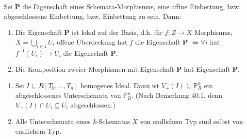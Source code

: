 \begin{rem}[40]
  Sei \textbf{P} die Eigenschaft eines Schemata-Morphismus, eine affine
  Einbettung, bzw. abgeschlossene Einbettung, bzw. Einbettung zu sein.
  Dann:
  \begin{enumerate}
  \item Die Eigenschaft \textbf{P} ist lokal auf der Basis, d.h. für $f:Z\rightarrow X$
    Morphismus, $X=\bigcup_{i\in I}U_{i}$ offene Überdeckung hat $f$
    die Eigenschaft \textbf{P} $\Longleftrightarrow\forall i$ hat $f^{-1}(U_{i})\rightarrow U_{i}$
    die Eigenschaft \textbf{P}.
  \item Die Komposition zweier Morphismen mit Eigenschaft \textbf{P} hat Eigenschaft
    \textbf{P}.
  \end{enumerate}
\end{rem}

\begin{example}[41]
  \mbox{}
  \begin{enumerate}
  \item Sei $I\subseteq R[T_{0},\ldots,T_{n}]$ homogenes Ideal. Dann ist
    $V_{+}(I)\subseteq\mathbb{P}_{R}^{n}$ ein abgeschlossenes Unterschemata
    von $\mathbb{P}_{R}^{n}$. (Nach Bemerkung 40.1, denn $V_{+}(I)\cap U_{i}\subseteq U_{i}$
    abgeschlossen.)
  \item Alle Unterschemata eines $k$-Schematas $X$ von endlichem Typ sind
    selbst von endlichem Typ. 
  \end{enumerate}
\end{example}
